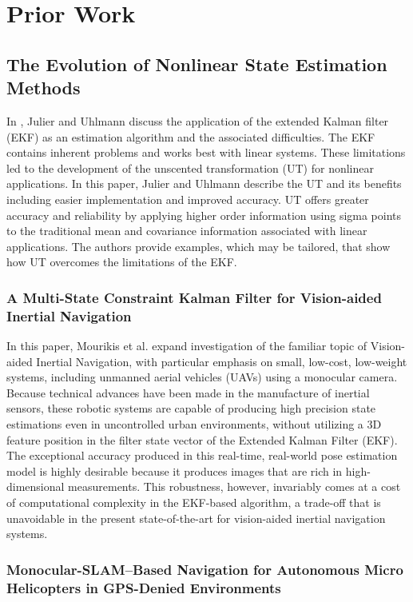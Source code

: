 \chapter{Prior Work}

\section{The Evolution of Nonlinear State Estimation Methods}

In \cite{Julier1997,Julier2004}, Julier and Uhlmann discuss the application of the extended Kalman filter (EKF) as an estimation algorithm and the associated difficulties. The EKF contains inherent problems and works best with linear systems. These limitations led to the development of the unscented transformation (UT) for nonlinear applications. In this paper, Julier and Uhlmann describe the UT and its benefits including easier implementation and improved accuracy. UT offers greater accuracy and reliability by applying higher order information using sigma points to the traditional mean and covariance information associated with linear applications. The authors provide examples, which may be tailored, that show how UT overcomes the limitations of the EKF.

\subsection{A Multi-State Constraint Kalman Filter for Vision-aided Inertial Navigation}

In this paper, Mourikis et al. expand investigation of the familiar topic of Vision-aided Inertial Navigation, with particular emphasis on small, low-cost, low-weight systems, including unmanned aerial vehicles (UAVs) using a monocular camera. Because technical advances have been made in the manufacture of inertial sensors, these robotic systems are capable of producing high precision state estimations even in uncontrolled urban environments, without utilizing a 3D feature position in the filter state vector of the Extended Kalman Filter (EKF). The exceptional accuracy produced in this real-time, real-world pose estimation model is highly desirable because it produces images that are rich in high-dimensional measurements. This robustness, however, invariably comes at a cost of computational complexity in the EKF-based algorithm, a trade-off that is unavoidable in the present state-of-the-art for vision-aided inertial navigation systems.

\subsection{Monocular-SLAM–Based Navigation for Autonomous Micro Helicopters in GPS-Denied Environments}

